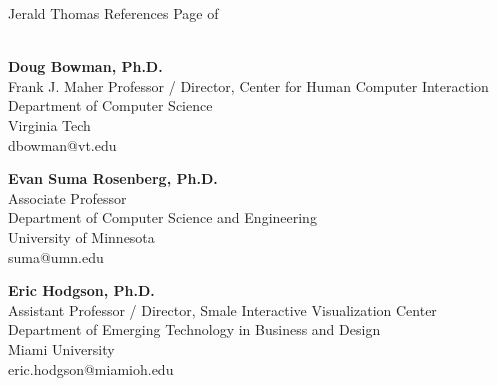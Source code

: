 \newpage

\setcounter{page}{1}
\makecvfooter
  {Jerald Thomas}
  {References}
  {Page \thepage \hspace{1pt} of \pageref{references_last}}


\makecvheader[C]
\singlespacing

\\

\textbf{Doug Bowman, Ph.D.}\\
\hspace*{0.25cm} Frank J. Maher Professor / Director, Center for Human Computer Interaction\\
\hspace*{0.25cm} Department of Computer Science\\
\hspace*{0.25cm} Virginia Tech\\
\hspace*{0.25cm} dbowman@vt.edu

\textbf{Evan Suma Rosenberg, Ph.D.}\\
\hspace*{0.25cm} Associate Professor\\
\hspace*{0.25cm} Department of Computer Science and Engineering\\
\hspace*{0.25cm} University of Minnesota\\
\hspace*{0.25cm} suma@umn.edu

\textbf{Eric Hodgson, Ph.D.}\\
\hspace*{0.25cm} Assistant Professor / Director, Smale Interactive Visualization Center\\
\hspace*{0.25cm} Department of Emerging Technology in Business and Design\\
\hspace*{0.25cm} Miami University\\
\hspace*{0.25cm} eric.hodgson@miamioh.edu


